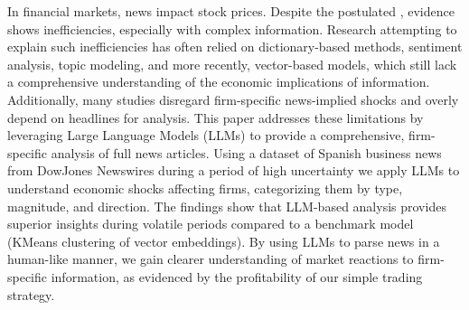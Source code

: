 In financial markets, news impact stock prices. Despite the postulated , evidence shows inefficiencies, especially with complex information. 
Research attempting to explain such inefficiencies has often relied on dictionary-based methods, sentiment analysis, topic modeling, and more recently, vector-based models,
which still lack a comprehensive understanding of the economic implications of information. 
Additionally, many studies disregard firm-specific news-implied shocks and overly depend on headlines for analysis. 
This paper addresses these limitations by leveraging Large Language Models (LLMs) to provide a comprehensive, firm-specific analysis of full news articles. 
Using a dataset of Spanish business news from DowJones Newswires during a period of high uncertainty we apply LLMs to understand economic shocks affecting firms, categorizing them by type, magnitude, and direction. 
The findings show that LLM-based analysis provides superior insights during volatile periods compared to a benchmark model (KMeans clustering of vector embeddings). 
By using LLMs to parse news in a human-like manner, we gain clearer understanding of market reactions to firm-specific information, as evidenced by the profitability of our simple trading strategy.
